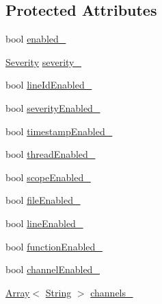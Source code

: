 \subsection*{Protected Attributes}
\begin{DoxyCompactItemize}
\item 
bool \mbox{\hyperlink{classlibrary_1_1core_1_1logger_1_1sinks_1_1_sink_ac1386fd47307e8956c345b5ec5725c8f}{enabled\+\_\+}}
\item 
\mbox{\hyperlink{namespacelibrary_1_1core_1_1logger_a35f71353edf64f68f7fe3874b01abaa8}{Severity}} \mbox{\hyperlink{classlibrary_1_1core_1_1logger_1_1sinks_1_1_sink_a49cd9c83a41cde12c4b0f5431c0e1b41}{severity\+\_\+}}
\item 
bool \mbox{\hyperlink{classlibrary_1_1core_1_1logger_1_1sinks_1_1_sink_a75d2b3e0a9551cd8788e3d9c320d79dd}{line\+Id\+Enabled\+\_\+}}
\item 
bool \mbox{\hyperlink{classlibrary_1_1core_1_1logger_1_1sinks_1_1_sink_af54f11a79fe19b15f2bc2f3783d382ba}{severity\+Enabled\+\_\+}}
\item 
bool \mbox{\hyperlink{classlibrary_1_1core_1_1logger_1_1sinks_1_1_sink_afebb8b5eef5abf365943cd10caf23bab}{timestamp\+Enabled\+\_\+}}
\item 
bool \mbox{\hyperlink{classlibrary_1_1core_1_1logger_1_1sinks_1_1_sink_abf1a3577855cc40b5075b4d73a3c86a2}{thread\+Enabled\+\_\+}}
\item 
bool \mbox{\hyperlink{classlibrary_1_1core_1_1logger_1_1sinks_1_1_sink_abffe5eb81e1eb858eaad2cc806b3806b}{scope\+Enabled\+\_\+}}
\item 
bool \mbox{\hyperlink{classlibrary_1_1core_1_1logger_1_1sinks_1_1_sink_a8691bad7f4c73aa394901e6e10b5fe47}{file\+Enabled\+\_\+}}
\item 
bool \mbox{\hyperlink{classlibrary_1_1core_1_1logger_1_1sinks_1_1_sink_a00b45879a45459f44475eab2618b30f9}{line\+Enabled\+\_\+}}
\item 
bool \mbox{\hyperlink{classlibrary_1_1core_1_1logger_1_1sinks_1_1_sink_acb68b94fd8745d1e06d1cc1f2caa2e73}{function\+Enabled\+\_\+}}
\item 
bool \mbox{\hyperlink{classlibrary_1_1core_1_1logger_1_1sinks_1_1_sink_a48307be32eede5359f345b54363070ae}{channel\+Enabled\+\_\+}}
\item 
\mbox{\hyperlink{classlibrary_1_1core_1_1ctnr_1_1_array}{Array}}$<$ \mbox{\hyperlink{classlibrary_1_1core_1_1types_1_1_string}{String}} $>$ \mbox{\hyperlink{classlibrary_1_1core_1_1logger_1_1sinks_1_1_sink_a3ba1eb6372e9bf6d2d8b3ff53d529021}{channels\+\_\+}}
\end{DoxyCompactItemize}


